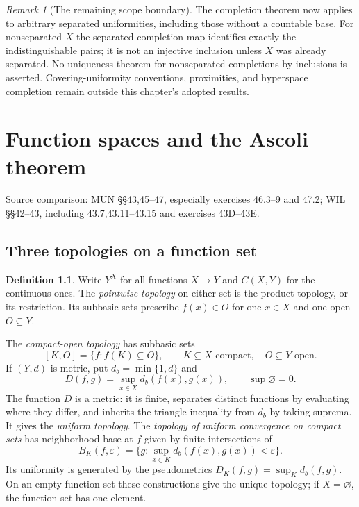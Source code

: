 \documentclass[11pt,oneside,openany]{book}
\theoremstyle{definition}
\newtheorem{definition}[theorem]{Definition}
\theoremstyle{remark}
\newtheorem{remark}[theorem]{Remark}
\newcommand{\eps}{\varepsilon}
\newcommand{\source}[1]{\par\begingroup\small\sffamily\color{black!65}Source comparison: #1\par\endgroup}
\begin{document}
\begin{remark}[The remaining scope boundary]\label{d10:12:completion-scope}
The completion theorem now applies to arbitrary separated uniformities, including those without a countable base. For nonseparated $X$ the separated completion map identifies exactly the indistinguishable pairs; it is not an injective inclusion unless $X$ was already separated. No uniqueness theorem for nonseparated completions by inclusions is asserted. Covering-uniformity conventions, proximities, and hyperspace completion remain outside this chapter's adopted results.
\end{remark}



\chapter{Function spaces and the Ascoli theorem}\label{ch:d10-13}
\source{MUN \S\S43,45--47, especially exercises 46.3--9 and 47.2; WIL \S\S42--43, including 43.7,43.11--43.15 and exercises 43D--43E.}

\section{Three topologies on a function set}

\begin{definition}\label{d10:13:function-topologies}
Write $Y^X$ for all functions $X\to Y$ and $C(X,Y)$ for the continuous ones. The \emph{pointwise topology} on either set is the product topology, or its restriction. Its subbasic sets prescribe $f(x)\in O$ for one $x\in X$ and one open $O\subseteq Y$.

The \emph{compact-open topology} has subbasic sets
\[
 [K,O]=\{f:f(K)\subseteq O\},\qquad K\subseteq X\text{ compact},\quad O\subseteq Y\text{ open}.
\]
If $(Y,d)$ is metric, put $d_b=\min\{1,d\}$ and
\[
 D(f,g)=\sup_{x\in X}d_b(f(x),g(x)),\qquad \sup\varnothing=0.
\]
The function $D$ is a metric: it is finite, separates distinct functions by evaluating where they differ, and inherits the triangle inequality from $d_b$ by taking suprema. It gives the \emph{uniform topology}. The \emph{topology of uniform convergence on compact sets} has neighborhood base at $f$ given by finite intersections of
\[
 B_K(f,\eps)=\{g:\sup_{x\in K}d_b(f(x),g(x))<\eps\}.
\]
Its uniformity is generated by the pseudometrics $D_K(f,g)=\sup_Kd_b(f,g)$. On an empty function set these constructions give the unique topology; if $X=\varnothing$, the function set has one element.
\end{definition}
\end{document}
